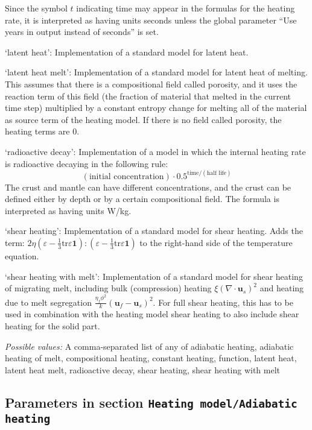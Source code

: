 \begin{itemize}
Since the symbol $t$ indicating time may appear in the formulas for the heating rate, it is interpreted as having units seconds unless the global parameter ``Use years in output instead of seconds'' is set.

`latent heat': Implementation of a standard model for latent heat.

`latent heat melt': Implementation of a standard model for latent heat of melting. This assumes that there is a compositional field called porosity, and it uses the reaction term of this field (the fraction of material that melted in the current time step) multiplied by a constant entropy change for melting all of the material as source term of the heating model.
If there is no field called porosity, the heating terms are 0.

`radioactive decay': Implementation of a model in which the internal heating rate is radioactive decaying in the following rule:
\[(\text{initial concentration})\cdot 0.5^{\text{time}/(\text{half life})}\]
The crust and mantle can have different concentrations, and the crust can be defined either by depth or by a certain compositional field.
The formula is interpreted as having units W/kg.

`shear heating': Implementation of a standard model for shear heating. Adds the term: $  2 \eta \left( \varepsilon - \frac{1}{3} \text{tr} \varepsilon \mathbf 1 \right) : \left( \varepsilon - \frac{1}{3} \text{tr} \varepsilon \mathbf 1 \right)$ to the right-hand side of the temperature equation.

`shear heating with melt': Implementation of a standard model for shear heating of migrating melt, including bulk (compression) heating $\xi \left( \nabla \cdot \mathbf u_s \right)^2 $ and heating due to melt segregation $\frac{\eta_f \phi^2}{k} \left( \mathbf u_f - \mathbf u_s \right)^2 $. For full shear heating, this has to be used in combination with the heating model shear heating to also include shear heating for the solid part.


{\it Possible values:} A comma-separated list of any of adiabatic heating, adiabatic heating of melt, compositional heating, constant heating, function, latent heat, latent heat melt, radioactive decay, shear heating, shear heating with melt
\end{itemize}



\subsection{Parameters in section \tt Heating model/Adiabatic heating}
\label{parameters:Heating_20model/Adiabatic_20heating}

